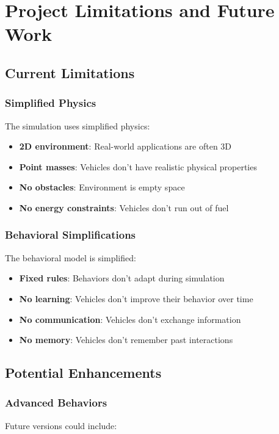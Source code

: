 \documentclass[12pt,a4paper]{article}
\begin{document}
\section{Project Limitations and Future Work}

\subsection{Current Limitations}

\subsubsection{Simplified Physics}
The simulation uses simplified physics:

\begin{itemize}
    \item \textbf{2D environment}: Real-world applications are often 3D
    \item \textbf{Point masses}: Vehicles don't have realistic physical properties
    \item \textbf{No obstacles}: Environment is empty space
    \item \textbf{No energy constraints}: Vehicles don't run out of fuel
\end{itemize}

\subsubsection{Behavioral Simplifications}
The behavioral model is simplified:

\begin{itemize}
    \item \textbf{Fixed rules}: Behaviors don't adapt during simulation
    \item \textbf{No learning}: Vehicles don't improve their behavior over time
    \item \textbf{No communication}: Vehicles don't exchange information
    \item \textbf{No memory}: Vehicles don't remember past interactions
\end{itemize}

\subsection{Potential Enhancements}

\subsubsection{Advanced Behaviors}
Future versions could include:
\end{document}

